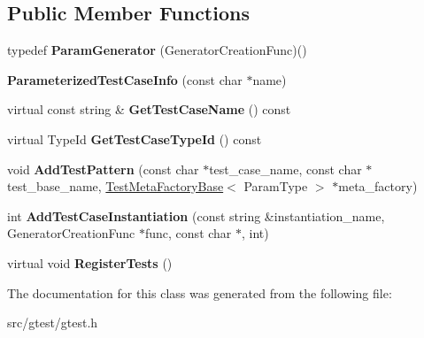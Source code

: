 \subsection*{Public Member Functions}
\begin{DoxyCompactItemize}
\item 
\mbox{\label{classtesting_1_1internal_1_1_parameterized_test_case_info_a2f6a423f7ae8c7ac24b468538693aa26}} 
typedef {\bfseries Param\+Generator} (Generator\+Creation\+Func)()
\item 
\mbox{\label{classtesting_1_1internal_1_1_parameterized_test_case_info_a0a03ac9620ed8f0266f74ff774de9b71}} 
{\bfseries Parameterized\+Test\+Case\+Info} (const char $\ast$name)
\item 
\mbox{\label{classtesting_1_1internal_1_1_parameterized_test_case_info_a1a0914bca60b3437ee693f98571be7fa}} 
virtual const string \& {\bfseries Get\+Test\+Case\+Name} () const
\item 
\mbox{\label{classtesting_1_1internal_1_1_parameterized_test_case_info_a16ed77e95a6042c722d0029744acfc33}} 
virtual Type\+Id {\bfseries Get\+Test\+Case\+Type\+Id} () const
\item 
\mbox{\label{classtesting_1_1internal_1_1_parameterized_test_case_info_a3e557c888ec5e23b138c2ff254db15e5}} 
void {\bfseries Add\+Test\+Pattern} (const char $\ast$test\+\_\+case\+\_\+name, const char $\ast$test\+\_\+base\+\_\+name, \mbox{\hyperlink{classtesting_1_1internal_1_1_test_meta_factory_base}{Test\+Meta\+Factory\+Base}}$<$ Param\+Type $>$ $\ast$meta\+\_\+factory)
\item 
\mbox{\label{classtesting_1_1internal_1_1_parameterized_test_case_info_afa906b3f9fbc494ba13cf491abbc81fa}} 
int {\bfseries Add\+Test\+Case\+Instantiation} (const string \&instantiation\+\_\+name, Generator\+Creation\+Func $\ast$func, const char $\ast$, int)
\item 
\mbox{\label{classtesting_1_1internal_1_1_parameterized_test_case_info_a7e118820b3074ce70c0440e2e49a50a1}} 
virtual void {\bfseries Register\+Tests} ()
\end{DoxyCompactItemize}


The documentation for this class was generated from the following file\+:\begin{DoxyCompactItemize}
\item 
src/gtest/gtest.\+h\end{DoxyCompactItemize}

